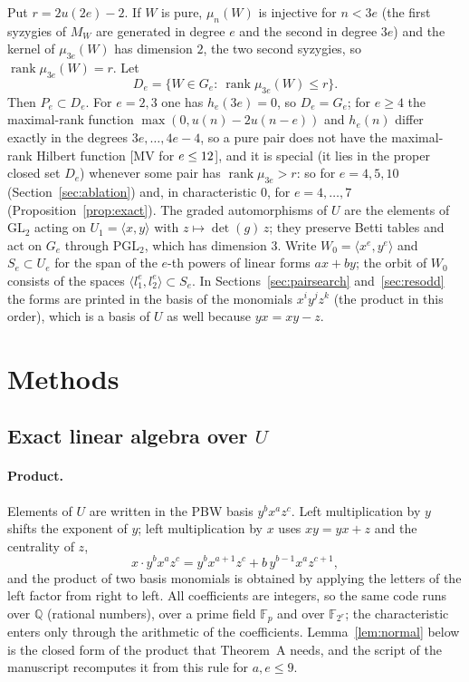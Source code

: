 \documentclass[11pt]{article}
\theoremstyle{definition}
\theoremstyle{remark}
\newcommand{\Q}{\mathbb{Q}}
\newcommand{\F}{\mathbb{F}}
\begin{document}
Put $r=2u(2e)-2$. If $W$ is pure, $\mu_n(W)$ is injective for $n<3e$ (the first syzygies of $M_W$ are generated in degree $e$ and the second in degree $3e$) and the kernel of $\mu_{3e}(W)$ has dimension $2$, the two second syzygies, so $\operatorname{rank}\mu_{3e}(W)=r$. Let
\begin{equation}\label{eq:De}
D_e=\{W\in G_e:\ \operatorname{rank}\mu_{3e}(W)\le r\}.
\end{equation}
Then $P_e\subset D_e$. For $e=2,3$ one has $h_e(3e)=0$, so $D_e=G_e$; for $e\ge4$ the maximal-rank function $\max(0,u(n)-2u(n-e))$ and $h_e(n)$ differ exactly in the degrees $3e,\dots,4e-4$, so a pure pair does not have the maximal-rank Hilbert function [MV for $e\le12$], and it is special (it lies in the proper closed set $D_e$) whenever some pair has $\operatorname{rank}\mu_{3e}>r$: so for $e=4,5,10$ (Section~\ref{sec:ablation}) and, in characteristic $0$, for $e=4,\dots,7$ (Proposition~\ref{prop:exact}). The graded automorphisms of $U$ are the elements of $\mathrm{GL}_2$ acting on $U_1=\langle x,y\rangle$ with $z\mapsto\det(g)\,z$; they preserve Betti tables and act on $G_e$ through $\mathrm{PGL}_2$, which has dimension $3$. Write $W_0=\langle x^e,y^e\rangle$ and $S_e\subset U_e$ for the span of the $e$-th powers of linear forms $ax+by$; the orbit of $W_0$ consists of the spaces $\langle l_1^e,l_2^e\rangle\subset S_e$. In Sections~\ref{sec:pairsearch} and~\ref{sec:resodd} the forms are printed in the basis of the monomials $x^iy^jz^k$ (the product in this order), which is a basis of $U$ as well because $yx=xy-z$.

\FloatBarrier
\section{Methods}
\label{sec:methods}

\subsection{Exact linear algebra over \texorpdfstring{$U$}{U}}
\label{sec:exactU}

\paragraph{Product.} Elements of $U$ are written in the PBW basis $y^bx^az^c$. Left multiplication by $y$ shifts the exponent of $y$; left multiplication by $x$ uses $xy=yx+z$ and the centrality of $z$,
\[
x\cdot y^bx^az^c=y^bx^{a+1}z^c+b\,y^{b-1}x^az^{c+1},
\]
and the product of two basis monomials is obtained by applying the letters of the left factor from right to left. All coefficients are integers, so the same code runs over $\Q$ (rational numbers), over a prime field $\F_p$ and over $\F_{2^r}$; the characteristic enters only through the arithmetic of the coefficients. Lemma~\ref{lem:normal} below is the closed form of the product that Theorem~A needs, and the script of the manuscript recomputes it from this rule for $a,e\le9$.
\end{document}
